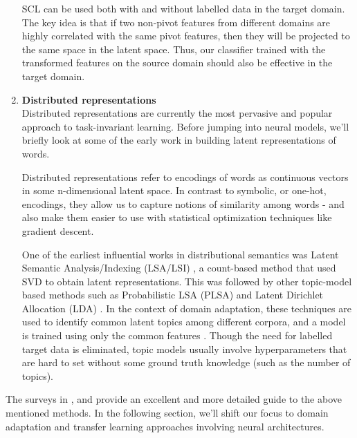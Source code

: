 \documentclass[12pt]{report}
\begin{document}
\begin{enumerate}
   SCL can be used both with and without labelled data in the target domain. The key idea is that if two non-pivot features from different domains are highly correlated with the same pivot features, then they will be projected to the same space in the latent space. Thus, our classifier trained with the transformed features on the source domain should also be effective in the target domain. 
   
		
		\item \textbf{Distributed representations} \\
		Distributed representations are currently the most pervasive and popular approach to task-invariant learning. Before jumping into neural models, we'll briefly look at some of the early work in building latent representations of words.
		\par Distributed representations refer to encodings of words as continuous vectors in some n-dimensional latent space. In contrast to symbolic, or one-hot, encodings, they allow us to capture notions of similarity among words - and also make them easier to use with statistical optimization techniques like gradient descent. 
		\par One of the earliest influential works in distributional semantics was Latent Semantic Analysis/Indexing (LSA/LSI) \citep{deerwester1990indexing}, a count-based method that used SVD to obtain latent representations. This was followed by other topic-model based methods such as Probabilistic LSA (PLSA) \citep{hofmann1999probabilistic} and Latent Dirichlet Allocation (LDA) \citep{blei2003latent}. In the context of domain adaptation, these techniques are used to identify common latent topics among different corpora, and a model is trained using only the common features \citep{guo2009domain}. Though the need for labelled target data is eliminated, topic models usually involve hyperparameters that are hard to set without some ground truth knowledge (such as the number of topics).
		
	\end{enumerate}
 	 The surveys in \citep{pan2010survey}, \citep{li2012literature} and \citep{jiang2008literature} provide an excellent and more detailed guide to the above mentioned methods. In the following section, we'll shift our focus to domain adaptation and transfer learning approaches involving neural architectures.
\end{document}
